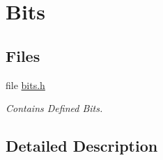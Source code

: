 \hypertarget{group__csb337__bits}{}\section{Bits}
\label{group__csb337__bits}
\subsection*{Files}
\begin{DoxyCompactItemize}
\item 
file \mbox{\hyperlink{bits_8h}{bits.\+h}}
\begin{DoxyCompactList}\small\item\em Contains Defined Bits. \end{DoxyCompactList}\end{DoxyCompactItemize}


\subsection{Detailed Description}

